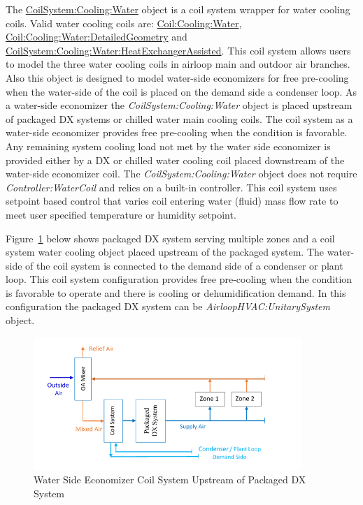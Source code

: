 The \hyperref[coilsystemcoolingwater]{CoilSystem:Cooling:Water} object is a coil system wrapper for water cooling coils. Valid water cooling coils are: \hyperref[coilcoolingwater]{Coil:Cooling:Water}, \hyperref[coilcoolingwaterdetailedgeometry]{Coil:Cooling:Water:DetailedGeometry} and \hyperref[coilsystemcoolingwaterheatexchangerassisted]{CoilSystem:Cooling:Water:HeatExchangerAssisted}. This coil system allows users to model the three water cooling coils in airloop main and outdoor air branches. Also this object is designed to model water-side economizers for free pre-cooling when the water-side of the coil is placed on the demand side a condenser loop. As a water-side economizer the \textit{CoilSystem:Cooling:Water} object is placed upstream of packaged DX systems or chilled water main cooling coils. The coil system as a water-side economizer provides free pre-cooling when the condition is favorable. Any remaining system cooling load not met by the water side economizer is provided either by a DX or chilled water cooling coil placed downstream of the water-side economizer coil. The \textit{CoilSystem:Cooling:Water} object does not require \textit{Controller:WaterCoil} and relies on a built-in controller. This coil system uses setpoint based control that varies coil entering water (fluid) mass flow rate to meet user specified temperature or humidity setpoint. 

Figure~\ref{fig:water-side-economizer-coil-system-upstream-of-packaged-dx-system} below shows packaged DX system serving multiple zones and a coil system water cooling object placed upstream of the packaged system. The water-side of the coil system is connected to the demand side of a condenser or plant loop. This coil system configuration provides free pre-cooling when the condition is favorable to operate and there is cooling or dehumidification demand. In this configuration the packaged DX system can be \textit{AirloopHVAC:UnitarySystem} object.

\begin{figure}[hbtp] %
\centering
\includegraphics[width=0.9\textwidth, height=0.9\textheight, keepaspectratio=true]{media/image141.png}
\caption{Water Side Economizer Coil System Upstream of Packaged DX System \protect \label{fig:water-side-economizer-coil-system-upstream-of-packaged-dx-system}}
\end{figure}

